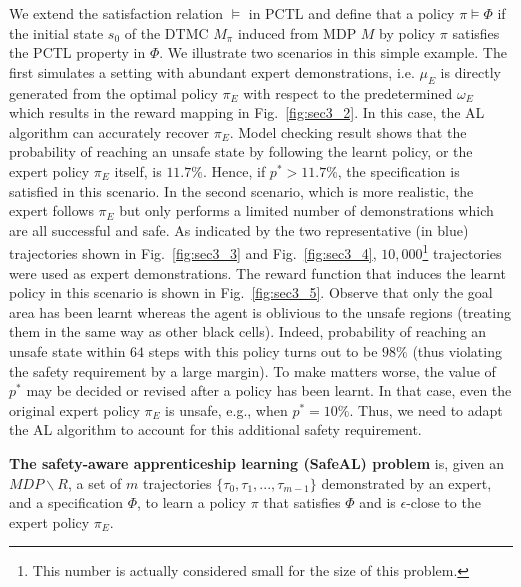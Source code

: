 We extend the satisfaction relation $\models$ in PCTL and define that a policy $\pi\models\Phi$ if the initial state $s_0$ of the DTMC $M_\pi$ induced from MDP $M$ by policy $\pi$ satisfies the PCTL property in $\Phi$. We illustrate two scenarios in this simple example. The first simulates a setting with abundant expert demonstrations, i.e. $\mu_E$ is directly generated from the optimal policy $\pi_E$ with respect to the predetermined $\omega_E$ which results in the reward mapping in Fig.~\ref{fig:sec3_2}. In this case, the AL algorithm can accurately recover $\pi_E$. 
Model checking result shows that the probability of reaching an unsafe state by following the learnt policy, or the expert policy $\pi_E$ itself, is $11.7\%$. Hence, if $p^*>11.7\%$, the specification is satisfied in this scenario. In the second scenario, which is more realistic, the expert follows $\pi_E$ but only performs a limited number of demonstrations which are all successful and safe. As indicated by the two representative (in blue) trajectories shown in Fig.~\ref{fig:sec3_3} and Fig.~\ref{fig:sec3_4}, $10,000$\footnote{This number is actually considered small for the size of this problem.} trajectories were used as expert demonstrations. 
The reward function that induces the learnt policy in this scenario is shown in Fig.~{\ref{fig:sec3_5}}.
Observe that only the goal area has been learnt whereas the agent is oblivious to the unsafe regions (treating them in the same way as other black cells). Indeed, probability of reaching an unsafe state within $64$ steps with this policy turns out to be $98\%$ (thus violating the safety requirement by a large margin).  
To make matters worse, the value of $p^*$ may be decided or revised after a policy has been learnt. In that case, even the original expert policy $\pi_E$ is unsafe, e.g., when $p^*=10\%$. 
Thus, we need to adapt the AL algorithm to account for this additional safety requirement. 
\begin{definition}
\textbf{The safety-aware apprenticeship learning (SafeAL) problem} is, given an $MDP\backslash R$, a set of $m$ trajectories $\{\tau_0, \tau_1, ..., \tau_{m-1}\}$ demonstrated by an expert, and a specification $\Phi$, to learn a policy $\pi$ that satisfies $\Phi$ and is $\epsilon$-close to the expert policy $\pi_E$.
\end{definition}
